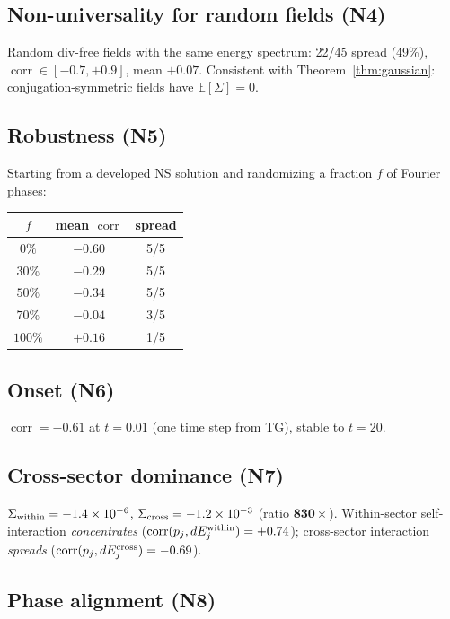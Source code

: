 \documentclass[11pt]{article}
\theoremstyle{definition}
\newcommand{\E}{\mathbb{E}}
\DeclareMathOperator{\corr}{corr}
\begin{document}
\subsection{Non-universality for random fields (N4)}

Random div-free fields with the same energy spectrum:
22/45 spread (49\%), $\corr\in[-0.7,+0.9]$,
mean $+0.07$.  Consistent with
Theorem~\ref{thm:gaussian}: conjugation-symmetric fields
have $\E[\Sigma]=0$.

\subsection{Robustness (N5)}

Starting from a developed NS solution and randomizing
a fraction $f$ of Fourier phases:
\begin{center}
\begin{tabular}{@{}ccc@{}}
\toprule
$f$ & mean $\corr$ & spread \\
\midrule
$0\%$ & $-0.60$ & 5/5 \\
$30\%$ & $-0.29$ & 5/5 \\
$50\%$ & $-0.34$ & 5/5 \\
$70\%$ & $-0.04$ & 3/5 \\
$100\%$ & $+0.16$ & 1/5 \\
\bottomrule
\end{tabular}
\end{center}

\subsection{Onset (N6)}

$\corr = -0.61$ at $t = 0.01$ (one time step from TG),
stable to $t = 20$.

\subsection{Cross-sector dominance (N7)}

$\Sigma_{\rm within} = -1.4\times 10^{-6}$,
$\Sigma_{\rm cross} = -1.2\times 10^{-3}$
(ratio $\mathbf{830\times}$).  Within-sector self-interaction
\emph{concentrates} ($\corr(p_j, dE^{\rm within}_j)=+0.74$);
cross-sector interaction \emph{spreads}
($\corr(p_j, dE^{\rm cross}_j) = -0.69$).

\subsection{Phase alignment (N8)}
\end{document}
